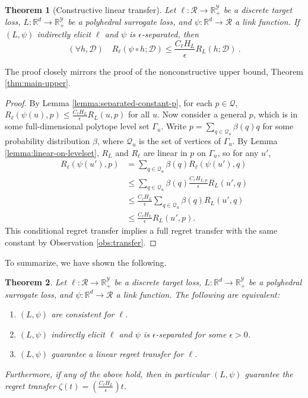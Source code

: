 \documentclass{article}
\newtheorem{theorem}{Theorem}
\theoremstyle{definition}\newtheorem{definition}{Definition}
\theoremstyle{definition}\newtheorem{assumption}{Assumption}
\newcommand{\reals}{\mathbb{R}}
\newcommand{\D}{\mathcal{D}}
\newcommand{\R}{\mathcal{R}}
\newcommand{\Y}{\mathcal{Y}}
\begin{document}
\begin{theorem}[Constructive linear transfer] \label{thm:separated-constant}
  Let $\ell: \R \to \reals_+^{\Y}$ be a discrete target loss, $L: \reals^d \to \reals_+^{\Y}$ be a polyhedral surrogate loss, and $\psi: \reals^d \to \R$ a link function.
  If $(L,\psi)$ indirectly elicit $\ell$ and $\psi$ is $\epsilon$-separated, then
    \[ (\forall h,\D) \quad R_{\ell}(\psi \circ h ; \D) \leq \frac{C_{\ell} H_L}{\epsilon} R_L(h ; \D) ~. \]
\end{theorem}
The proof closely mirrors the proof of the nonconstructive upper bound, Theorem \ref{thm:main-upper}.
\begin{proof}
  By Lemma \ref{lemma:separated-constant-p}, for each $p \in \mathcal{Q}$, $R_{\ell}(\psi(u),p) \leq \frac{C_{\ell} H_L}{\epsilon} R_L(u,p)$ for all $u$.
  Now consider a general $p$, which is in some full-dimensional polytope level set $\Gamma_u$.
  Write $p = \sum_{q \in \mathcal{Q}_u} \beta(q) q$ for some probability distribution $\beta$, where $\mathcal{Q}_u$ is the set of vertices of $\Gamma_u$.
  By Lemma \ref{lemma:linear-on-levelset}, $R_L$ and $R_{\ell}$ are linear in $p$ on $\Gamma_u$, so for any $u'$,
  \begin{align*}
    R_{\ell}(\psi(u'),p)
    &=    \sum_{q \in \mathcal{Q}_u} \beta(q) R_{\ell}(\psi(u'), q)  \\
    &\leq \sum_{q \in \mathcal{Q}_u} \beta(q) \frac{C_{\ell} H_{L,p}}{\epsilon} R_L(u', q)  \\
    &\leq \frac{C_{\ell} H_L}{\epsilon} \sum_{q \in \mathcal{Q}_u} \beta(q) R_L(u', q)  \\
    &\leq \frac{C_{\ell} H_L}{\epsilon} R_L(u', p) .
  \end{align*}
  This conditional regret transfer implies a full regret transfer with the same constant by Observation \ref{obs:transfer}.
\end{proof}

To summarize, we have shown the following.

\begin{theorem} \label{thm:tfae}
  Let $\ell: \R \to \reals_+^{\Y}$ be a discrete target loss, $L: \reals^d \to \reals_+^{\Y}$ be a polyhedral surrogate loss, and $\psi: \reals^d \to \R$ a link function.
  The following are equivalent:
  \begin{enumerate}
    \item $(L,\psi)$ are consistent for $\ell$.
    \item $(L,\psi)$ indirectly elicit $\ell$ and $\psi$ is $\epsilon$-separated for some $\epsilon > 0$.
    \item $(L,\psi)$ guarantee a linear regret transfer for $\ell$.
  \end{enumerate}
  Furthermore, if any of the above hold, then in particular $(L,\psi)$ guarantee the regret transfer $\zeta(t) = \left(\frac{C_{\ell} H_L}{\epsilon}\right) t$.
\end{theorem}
\end{document}
